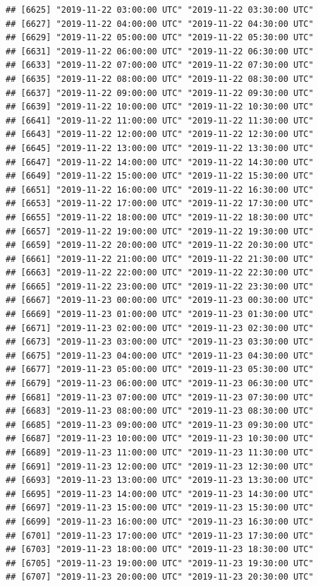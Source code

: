 \documentclass{article}\usepackage[]{graphicx}\usepackage[]{color}
\makeatletter
\newenvironment{kframe}{%
 \def\at@end@of@kframe{}%
 \ifinner\ifhmode%
  \def\at@end@of@kframe{\end{minipage}}%
  \begin{minipage}{\columnwidth}%
 \fi\fi%
 \def\FrameCommand##1{\hskip\@totalleftmargin \hskip-\fboxsep
 \colorbox{shadecolor}{##1}\hskip-\fboxsep
     \hskip-\linewidth \hskip-\@totalleftmargin \hskip\columnwidth}%
 \MakeFramed {\advance\hsize-\width
   \@totalleftmargin\z@ \linewidth\hsize
   \@setminipage}}%
 {\par\unskip\endMakeFramed%
 \at@end@of@kframe}
\newenvironment{knitrout}{}{} %
\makeatother
\begin{document}
\begin{knitrout}
\begin{kframe}
\begin{verbatim}
## [6625] "2019-11-22 03:00:00 UTC" "2019-11-22 03:30:00 UTC"
## [6627] "2019-11-22 04:00:00 UTC" "2019-11-22 04:30:00 UTC"
## [6629] "2019-11-22 05:00:00 UTC" "2019-11-22 05:30:00 UTC"
## [6631] "2019-11-22 06:00:00 UTC" "2019-11-22 06:30:00 UTC"
## [6633] "2019-11-22 07:00:00 UTC" "2019-11-22 07:30:00 UTC"
## [6635] "2019-11-22 08:00:00 UTC" "2019-11-22 08:30:00 UTC"
## [6637] "2019-11-22 09:00:00 UTC" "2019-11-22 09:30:00 UTC"
## [6639] "2019-11-22 10:00:00 UTC" "2019-11-22 10:30:00 UTC"
## [6641] "2019-11-22 11:00:00 UTC" "2019-11-22 11:30:00 UTC"
## [6643] "2019-11-22 12:00:00 UTC" "2019-11-22 12:30:00 UTC"
## [6645] "2019-11-22 13:00:00 UTC" "2019-11-22 13:30:00 UTC"
## [6647] "2019-11-22 14:00:00 UTC" "2019-11-22 14:30:00 UTC"
## [6649] "2019-11-22 15:00:00 UTC" "2019-11-22 15:30:00 UTC"
## [6651] "2019-11-22 16:00:00 UTC" "2019-11-22 16:30:00 UTC"
## [6653] "2019-11-22 17:00:00 UTC" "2019-11-22 17:30:00 UTC"
## [6655] "2019-11-22 18:00:00 UTC" "2019-11-22 18:30:00 UTC"
## [6657] "2019-11-22 19:00:00 UTC" "2019-11-22 19:30:00 UTC"
## [6659] "2019-11-22 20:00:00 UTC" "2019-11-22 20:30:00 UTC"
## [6661] "2019-11-22 21:00:00 UTC" "2019-11-22 21:30:00 UTC"
## [6663] "2019-11-22 22:00:00 UTC" "2019-11-22 22:30:00 UTC"
## [6665] "2019-11-22 23:00:00 UTC" "2019-11-22 23:30:00 UTC"
## [6667] "2019-11-23 00:00:00 UTC" "2019-11-23 00:30:00 UTC"
## [6669] "2019-11-23 01:00:00 UTC" "2019-11-23 01:30:00 UTC"
## [6671] "2019-11-23 02:00:00 UTC" "2019-11-23 02:30:00 UTC"
## [6673] "2019-11-23 03:00:00 UTC" "2019-11-23 03:30:00 UTC"
## [6675] "2019-11-23 04:00:00 UTC" "2019-11-23 04:30:00 UTC"
## [6677] "2019-11-23 05:00:00 UTC" "2019-11-23 05:30:00 UTC"
## [6679] "2019-11-23 06:00:00 UTC" "2019-11-23 06:30:00 UTC"
## [6681] "2019-11-23 07:00:00 UTC" "2019-11-23 07:30:00 UTC"
## [6683] "2019-11-23 08:00:00 UTC" "2019-11-23 08:30:00 UTC"
## [6685] "2019-11-23 09:00:00 UTC" "2019-11-23 09:30:00 UTC"
## [6687] "2019-11-23 10:00:00 UTC" "2019-11-23 10:30:00 UTC"
## [6689] "2019-11-23 11:00:00 UTC" "2019-11-23 11:30:00 UTC"
## [6691] "2019-11-23 12:00:00 UTC" "2019-11-23 12:30:00 UTC"
## [6693] "2019-11-23 13:00:00 UTC" "2019-11-23 13:30:00 UTC"
## [6695] "2019-11-23 14:00:00 UTC" "2019-11-23 14:30:00 UTC"
## [6697] "2019-11-23 15:00:00 UTC" "2019-11-23 15:30:00 UTC"
## [6699] "2019-11-23 16:00:00 UTC" "2019-11-23 16:30:00 UTC"
## [6701] "2019-11-23 17:00:00 UTC" "2019-11-23 17:30:00 UTC"
## [6703] "2019-11-23 18:00:00 UTC" "2019-11-23 18:30:00 UTC"
## [6705] "2019-11-23 19:00:00 UTC" "2019-11-23 19:30:00 UTC"
## [6707] "2019-11-23 20:00:00 UTC" "2019-11-23 20:30:00 UTC"

\end{verbatim}
\end{kframe}
\end{knitrout}
\end{document}
